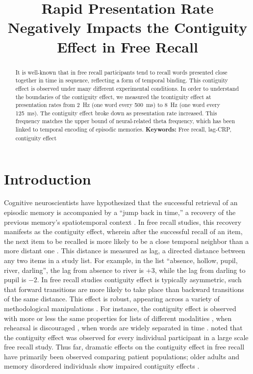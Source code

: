\documentclass[10pt,letterpaper]{article}
\title{Rapid Presentation Rate Negatively Impacts the Contiguity Effect in Free Recall}
\author{{\large \bf Claudio Toro-Serey (ctoro@bu.edu) \and Ian M. Bright (imbright@bu.edu)} \\
  Department of Psychological and Brain Sciences, 64 Cummington Mall\\
  Boston, MA 02215 USA
  \AND
    {\large \bf Brad Wyble (bpw10@psu.edu)} \\
  Department of Psychology, 140 Moore Building\\
  University Park, PA 16801 USA
  \AND
  {\large \bf Marc W. Howard (marc777@bu.edu)} \\
  Department of Psychological and Brain Sciences, 64 Cummington Mall\\
  Boston, MA 02215 USA}
\begin{document}
\maketitle

\begin{abstract}
It is well-known that  in free recall participants tend to recall  
words presented close together in time in sequence, reflecting a form of
temporal binding.
This  contiguity effect is observed under many different experimental
conditions.  In order to understand the boundaries of the contiguity effect,
we measured the tcontiguity effect at presentation rates from
2~Hz (one word every 500~ms) to 8~Hz (one word every 125~ms). The contiguity
effect broke down as presentation rate increased.  This frequency matches the
upper bound of neural-related theta frequency, which has been linked to
temporal encoding of episodic memories. 
\textbf{Keywords:} 
Free recall, lag-CRP, contiguity effect 
\end{abstract}

\section{Introduction}

Cognitive neuroscientists have hypothesized that the successful retrieval of
an episodic memory is accompanied by a ``jump back in time,'' a recovery of
the previous memory's spatiotemporal context \cite{Tulv83}. In free recall
studies, this recovery manifests as the contiguity effect, wherein after the
successful recall of an item, the next item to be recalled is more likely to
be a close temporal neighbor than a more distant one \cite{Kaha96}. 
This distance is measured as lag, a directed distance between any two items in
a study list. For example, in the list ``absence, hollow, pupil, river,
darling'', the lag from absence to river is $+3$, while the lag from darling to
pupil is $-2$.  
In free recall studies contiguity effect is typically asymmetric, such that
forward transitions are more likely to take place than backward transitions of
the same distance.  This effect is robust, appearing across a variety of
methodological manipulations \cite{Kaha12,HealKaha14}. 
For instance, the contiguity effect is observed with more or less the same
properties for lists of different modalities \cite{Kaha96}, when rehearsal is
discouraged \cite{HowaKaha99}, when words are widely separated in time
\cite{HowaEtal08,Unsw08}.   noted that the contiguity effect
was observed for every individual participant in a large scale free recall
study.   Thus far, dramatic effects on the contiguity effect in free recall
have primarily been observed comparing patient populations; older adults and
memory disordered individuals show impaired contiguity effects
\cite{KahaEtal02,PaloEtal19}.
\end{document}
